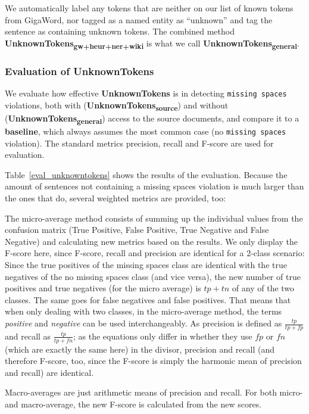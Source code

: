 \documentclass[a4paper,10pt]{scrartcl}
\theoremstyle{style}
\begin{document}
We automatically label any tokens that are neither on our list of known tokens from GigaWord, nor tagged as a named entity as ``unknown'' and tag the sentence as containing unknown tokens. The combined method \textbf{UnknownTokens\textsubscript{gw+heur+ner+wiki}} is what we call \textbf{UnknownTokens\textsubscript{general}}.

\subsubsection{Evaluation of UnknownTokens}
We evaluate how effective \textbf{UnknownTokens} is in detecting \texttt{missing spaces} violations, both with (\textbf{UnknownTokens\textsubscript{source}}) and without (\textbf{UnknownTokens\textsubscript{general}}) access to the source documents, and compare it to a \textbf{baseline}, which always assumes the most common case (no \texttt{missing spaces} violation).
The standard metrics precision, recall and F-score are used for evaluation.

Table~\ref{eval_unknowntokens} shows the results of the evaluation. Because the amount of sentences not containing a missing spaces violation is much larger than the ones that do, several weighted metrics are provided, too:

The micro-average method consists of summing up the individual values from the confusion matrix (True Positive, False Positive, True Negative and False Negative) and calculating new metrics based on the results. We only display the F-score here, since F-score, recall and precision are identical for a 2-class scenario: Since the true positives of the missing spaces class are identical with the true negatives of the no missing spaces class (and vice versa), the new number of true positives and true negatives (for the micro average) is $tp + tn$ of any of the two classes. The same goes for false negatives and false positives. That means that when only dealing with two classes, in the micro-average method, the terms \textit{positive} and \textit{negative} can be used interchangeably. As precision is defined as $\frac{tp}{tp+fp}$ and recall as $\frac{tp}{tp+fn}$; as the equations only differ in whether they use $fp$ or $fn$ (which are exactly the same here) in the divisor, precision and recall (and therefore F-score, too, since the F-score is simply the harmonic mean of precision and recall) are identical.

Macro-averages are just arithmetic means of precision and recall. For both micro- and macro-average, the new F-score is calculated from the new scores.
\end{document}
